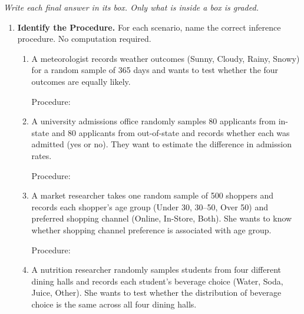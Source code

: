 \documentclass[10pt]{article}
\begin{document}
{\small\itshape Write each final answer in its box. Only what is inside a box is graded.}\par

\vspace{0.10in}

\begin{enumerate}

\item \textbf{Identify the Procedure.} \; For each scenario, name the correct inference
      procedure. No computation required.

\begin{enumerate}[label=\alph*.]
  \item A meteorologist records weather outcomes (Sunny, Cloudy, Rainy, Snowy) for a random
        sample of 365 days and wants to test whether the four outcomes are equally likely.

        Procedure: \gradedkey{\gradedblank[id=hw1a, type=short, points=1, answer={chi-square goodness-of-fit test}, check=text, display={\bfseries $\chi^2$ goodness-of-fit test}]{3.5in}{0.3in}}

  \item A university admissions office randomly samples 80 applicants from in-state and 80
        applicants from out-of-state and records whether each was admitted (yes or no). They
        want to estimate the difference in admission rates.

        Procedure: \gradedkey{\gradedblank[id=hw1b, type=short, points=1, answer={two-sample z-interval for p1 - p2}, check=text, display={\bfseries Two-sample $z$-interval for $p_1 - p_2$}]{3.5in}{0.3in}}

  \item A market researcher takes one random sample of 500 shoppers and records each shopper's
        age group (Under 30, 30--50, Over 50) and preferred shopping channel (Online, In-Store,
        Both). She wants to know whether shopping channel preference is associated with age group.

        Procedure: \gradedkey{\gradedblank[id=hw1c, type=short, points=1, answer={chi-square test for independence}, check=text, display={\bfseries $\chi^2$ test for independence}]{3.5in}{0.3in}}

  \item A nutrition researcher randomly samples students from four different dining halls and
        records each student's beverage choice (Water, Soda, Juice, Other). She wants to test
        whether the distribution of beverage choice is the same across all four dining halls.


\end{enumerate}
\end{enumerate}
\end{document}
